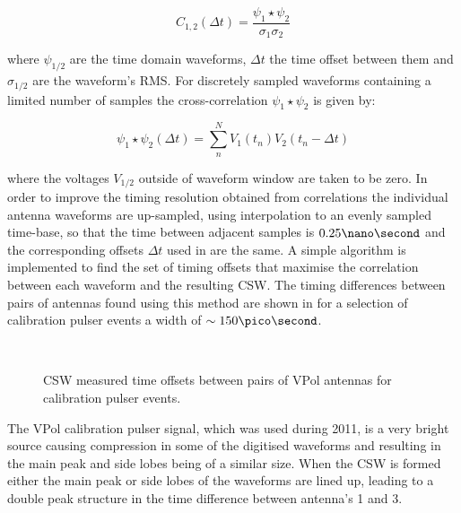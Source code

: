 \begin{equation}
  C_{1,2}(\Delta t) = \frac{\psi_{1} \star \psi_{2}}{\sigma_{1} \sigma_{2}}
  \label{eq:analysis:Reconstruction:Normalised-Cross-Correlation}
\end{equation}

\noindent where $\psi_{1/2}$ are the time domain waveforms, $\Delta t$ the time offset between them and $\sigma_{1/2}$ are the waveform's RMS. For discretely sampled waveforms containing a limited number of samples the cross-correlation $\psi_{1} \star \psi_{2}$ is given by:

\begin{equation}
  \psi_{1} \star \psi_{2} (\Delta t) = \sum_{n}^{N} V_{1}(t_{n}) V_{2}(t_{n}-\Delta t)
  \label{eq:analysis:Reconstruction:Discrete-Cross-Correlation}
\end{equation}

\noindent where the voltages $V_{1/2}$ outside of waveform window are taken to be zero. In order to improve the timing resolution obtained from correlations the individual antenna waveforms are up-sampled, using interpolation to an evenly sampled time-base, so that the time between adjacent samples is $0.25 \nano \second$ and the corresponding offsets $\Delta t$ used in  are the same. A simple algorithm is implemented to find the set of timing offsets that maximise the correlation between each waveform and the resulting CSW. The timing differences between pairs of antennas found using this method are shown in  for a selection of calibration pulser events a width of $\sim 150 \pico \second$. 

\begin{figure}[htpb]
  \hfill
  \\
  \hfill
  \caption{CSW measured time offsets between pairs of VPol antennas for calibration pulser events.}
  \label{fig:analysis:Reconstruction:CSW-DeltaT}
\end{figure}


The VPol calibration pulser signal, which was used during 2011, is a very bright source causing compression in some of the digitised waveforms and resulting in the main peak and side lobes being of a similar size. When the CSW is formed either the main peak or side lobes of the waveforms are lined up, leading to a double peak structure in the time difference between antenna's 1 and 3. 

